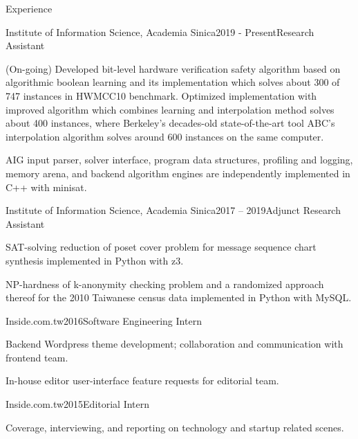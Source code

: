 \documentclass{resume} %
\begin{document}
\begin{rSection}{Experience}

\begin{rSubsection}{Institute of Information Science, Academia Sinica}{2019 - Present}{Research Assistant}{}
\item (On-going) Developed bit-level hardware verification safety algorithm based on algorithmic boolean learning and
its implementation which solves about 300 of 747 instances in HWMCC10 benchmark.
Optimized implementation with improved algorithm which combines learning and interpolation method solves about 400 instances,
where Berkeley's decades-old state-of-the-art tool ABC's interpolation algorithm solves around 600 instances on the same computer.

AIG input parser, solver interface, program data structures, profiling and logging,
memory arena, and backend algorithm engines are independently implemented in C++ with minisat.
\end{rSubsection}


\begin{rSubsection}{Institute of Information Science, Academia Sinica}{2017 – 2019}{Adjunct Research Assistant}{}
\item SAT-solving reduction of poset cover problem for message sequence chart synthesis  implemented in Python with z3.
\item NP-hardness of k-anonymity checking problem and a randomized approach thereof for the 2010 Taiwanese census data
implemented in Python with MySQL.
\end{rSubsection}


\begin{rSubsection}{Inside.com.tw}{2016}{Software Engineering Intern}{}
\item Backend Wordpress theme development; collaboration  and communication with frontend team.
\item In-house editor user-interface feature requests for editorial team.
\end{rSubsection}


\begin{rSubsection}{Inside.com.tw}{2015}{Editorial Intern}{}
\item Coverage, interviewing, and reporting on technology and startup related scenes.
\end{rSubsection}

\end{rSection}
\end{document}
